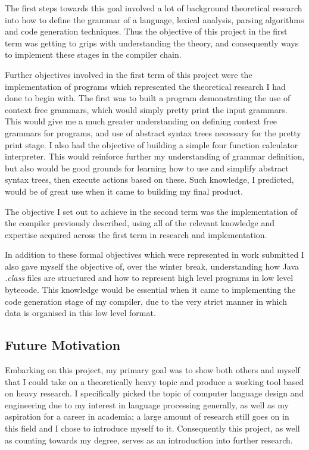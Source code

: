 \documentclass[a4paper, 11pt]{article}
\begin{document}
The first steps towards this goal involved a lot of background theoretical research into how to define the grammar of a language, lexical analysis, parsing algorithms and code generation techniques. Thus the objective of this project in the first term was getting to grips with understanding the theory, and consequently ways to implement these stages in the compiler chain. 

Further objectives involved in the first term of this project were the implementation of programs which represented the theoretical research I had done to begin with. The first was to built a program demonstrating the use of context free grammars, which would simply pretty print the input grammars. This would give me a much greater understanding on defining context free grammars for programs, and use of abstract syntax trees necessary for the pretty print stage. I also had the objective of building a simple four function calculator interpreter. This would reinforce further my understanding of grammar definition, but also would be good grounds for learning how to use and simplify abstract syntax trees, then execute actions based on these. Such knowledge, I predicted, would be of great use when it came to building my final product.

The objective I set out to achieve in the second term was the implementation of the compiler previously described, using all of the relevant knowledge and expertise acquired across the first term in research and implementation.

In addition to these formal objectives which were represented in work submitted I also gave myself the objective of, over the winter break, understanding how Java \textit{.class} files are structured and how to represent high level programs in low level bytecode. This knowledge would be essential when it came to implementing the code generation stage of my compiler, due to the very strict manner in which data is organised in this low level format.

\subsection{Future Motivation}
Embarking on this project, my primary goal was to show both others and myself that I could take on a theoretically heavy topic and produce a working tool based on heavy research. I specifically picked the topic of computer language design and engineering due to my interest in language processing generally, as well as my aspiration for a career in academia; a large amount of research still goes on in this field and I chose to introduce myself to it. Consequently this project, as well as counting towards my degree, serves as an introduction into further research.
\end{document}
